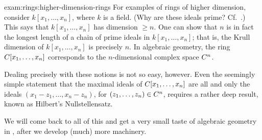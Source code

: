 \begin{exam}{}{exam:rings:higher-dimension-rings}
  For examples of rings of higher dimension, consider
  $k[x_1, \ldots, x_n]$, where $k$ is a field.  (Why are these ideals prime? Cf.\
  .) This says that
  $k[x_1, \ldots, x_n]$ has dimension $\geq n$. One can show that $n$
  is in fact the longest length of a chain of prime ideals in
  $k[x_1, \ldots, x_n]$; that is, the Krull dimension of
  $k[x_1, \ldots, x_n]$ is precisely $n$. In algebraic geometry, the
  ring $C[x_1, \ldots, x_n]$ corresponds to the $n$-dimensional
  complex space $C^n$.

  Dealing precisely with these notions is not so easy, however. Even
  the seemingly simple statement that the maximal ideals of
  $C[x_1, \ldots, x_n]$ are all and only the ideals
  $(x_1 - z_1, \ldots, x_n - z_n)$, for $(z_1, \ldots, z_n) \in C^n$,
  requires a rather deep result, known as Hilbert's Nullstellensatz.
\end{exam}

We will come back to all of this and get a very small taste of
algebraic geometry in
,
after we develop (much) more machinery.

